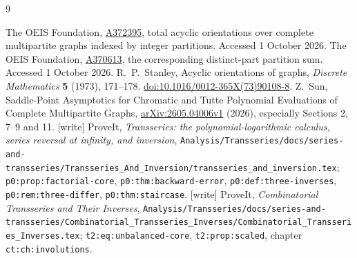 \documentclass[11pt]{article}
\theoremstyle{remark}\newtheorem{remark}[theorem]{Remark}
\begin{document}
\begin{thebibliography}{9}\raggedright
{} The OEIS Foundation,
\href{https://oeis.org/A372395}{A372395}, total acyclic orientations over
complete multipartite graphs indexed by integer partitions.
Accessed 1 October 2026.
 The OEIS Foundation,
\href{https://oeis.org/A370613}{A370613}, the corresponding distinct-part
partition sum. Accessed 1 October 2026.
 R.~P.~Stanley, Acyclic orientations of graphs,
\emph{Discrete Mathematics} \textbf{5} (1973), 171--178.
\href{https://doi.org/10.1016/0012-365X(73)90108-8}{doi:10.1016/0012-365X(73)90108-8}.
 Z.~Sun, Saddle-Point Asymptotics for Chromatic and Tutte
Polynomial Evaluations of Complete Multipartite Graphs,
\href{https://arxiv.org/abs/2605.04006v1}{arXiv:2605.04006v1} (2026),
especially Sections 2, 7--9 and 11.
 [write] ProveIt, \emph{Transseries: the polynomial-logarithmic calculus, series reversal at infinity, and inversion},
\texttt{Analysis/\allowbreak Transseries/\allowbreak docs/\allowbreak series-and-transseries/\allowbreak Transseries\_And\_Inversion/\allowbreak transseries\_and\_inversion.tex};
\texttt{p0:prop:factorial-core}, \texttt{p0:thm:backward-error}, \texttt{p0:def:three-inverses}, \texttt{p0:rem:three-differ}, \texttt{p0:thm:staircase}.
 [write] ProveIt, \emph{Combinatorial Transseries and Their Inverses},
\texttt{Analysis/\allowbreak Transseries/\allowbreak docs/\allowbreak series-and-transseries/\allowbreak Combinatorial\_Transseries\_Inverses/\allowbreak Combinatorial\_Transseries\_Inverses.tex};
\texttt{t2:eq:unbalanced-core}, \texttt{t2:prop:scaled}, chapter \texttt{ct:ch:involutions}.
\end{thebibliography}
\end{document}
